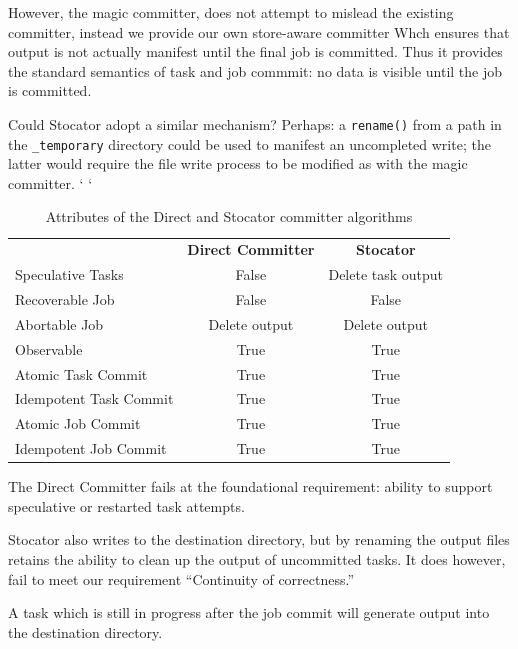 \documentclass[conference]{IEEEtran}
\begin{document}
However, the magic committer, does not attempt to mislead the existing committer,
instead we provide our own store-aware committer
Whch ensures that output is not actually manifest until
the final job is committed.
Thus it provides the standard semantics of task and job commmit: no data is
visible until the job is committed.

Could Stocator adopt a similar mechanism?
Perhaps: a \texttt{rename()} from a path in the \texttt{_temporary} directory
could be used to manifest an uncompleted write;
the latter would require the file write process to be modified as with
the magic committer.
`%
`


\begin{table}
  \label{tab:other-committer-attributes}
  \begin{tabular}{ l c c }
    \hline
    & \textbf{Direct Committer} & \textbf{Stocator} \\
    Speculative Tasks & False & Delete task output \\
    Recoverable Job & False & False \\
    Abortable Job & Delete output & Delete output \\
    Observable & True & True \\
    Atomic Task Commit & True & True \\
    Idempotent Task Commit & True & True \\
    Atomic Job Commit & True & True \\
    Idempotent Job Commit & True & True \\
    \hline
  \end{tabular}
  \caption{Attributes of the Direct and Stocator committer algorithms}
\end{table}


The Direct Committer fails at the foundational requirement: ability to support
speculative or restarted task attempts.

Stocator also writes to the destination directory, but by renaming the output
files retains the ability to clean up the output of uncommitted tasks.
It does however, fail to meet our requirement ``Continuity of correctness.''

A task which is still in progress after the job commit will generate output
into the destination directory.
\end{document}
